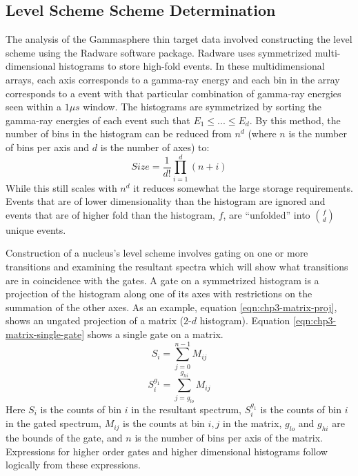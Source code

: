 \subsection{Level Scheme Scheme Determination}
\label{ssec:exp-pr-data-proc-lvl-scheme}
The analysis of the Gammasphere thin target data involved constructing the level scheme using the Radware software package\cite{radware}. Radware uses symmetrized multi-dimensional histograms to store high-fold events. In these multidimensional arrays, each axis corresponds to a gamma-ray energy and each bin in the array corresponds to a event with that particular combination of gamma-ray energies seen within a $1\mu{}s$ window. The histograms are symmetrized by sorting the gamma-ray energies of each event such that $E_1\leq{}...\leq{}E_d$. By this method, the number of bins in the histogram can be reduced from $n^d$ (where $n$ is the number of bins per axis and $d$ is the number of axes) to:
\begin{equation}
\label{eqn:chp3-hist-size}
Size=\frac{1}{d!}\prod\limits_{i=1}^{d}(n+i)
\end{equation}
While this still scales with $n^d$ it reduces somewhat the large storage requirements. Events that are of lower dimensionality than the histogram are ignored and events that are of higher fold than the histogram, $f$, are ``unfolded'' into $f \choose d$ unique events.

Construction of a nucleus's level scheme involves gating on one or more transitions and examining the resultant spectra which will show what transitions are in coincidence with the gates. A gate on a symmetrized histogram is a projection of the histogram along one of its axes with restrictions on the summation of the other axes. As an example, equation \ref{eqn:chp3-matrix-proj}, shows an ungated projection of a matrix ($2$-$d$ histogram). Equation \ref{eqn:chp3-matrix-single-gate} shows a single gate on a matrix.
\begin{equation}
\label{eqn:chp3-matrix-proj}
S_i = \sum\limits_{j=0}^{n-1}M_{ij}
\end{equation}
\begin{equation}
\label{eqn:chp3-matrix-single-gate}
S^{g_1}_i = \sum\limits_{j=g_{lo}}^{g_{hi}}M_{ij}
\end{equation}
Here $S_i$ is the counts of bin $i$ in the resultant spectrum, $S^{g_1}_i$ is the counts of bin $i$ in the gated spectrum, $M_{ij}$ is the counts at bin $i,j$ in the matrix, $g_{lo}$ and $g_{hi}$ are the bounds of the gate, and $n$ is the number of bins per axis of the matrix. Expressions for higher order gates and higher dimensional histograms follow logically from these expressions.


